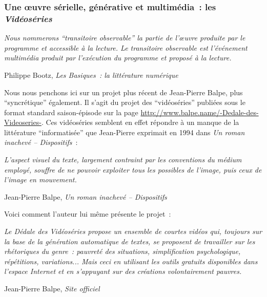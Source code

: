 \documentclass{article}
\newenvironment{citationbox}
{\begin{center}
		\begin{minipage}{.8\textwidth}
		}
		{
		\end{minipage}	
\end{center}
}
\begin{document}
			\subsubsection{Une œuvre sérielle, générative et multimédia~: les \textit{Vidéoséries}}
				\begin{citationbox}
					\textit{Nous nommerons ``transitoire observable'' la partie de l’œuvre produite par le programme et accessible à la lecture. Le transitoire observable est l’événement multimédia produit par l'exécution du programme et proposé à la lecture.}
					\begin{flushright}
						Philippe Bootz, \textit{Les Basiques~: la littérature numérique} \cite{bootz2006}
					\end{flushright}
				\end{citationbox}
				Nous nous penchons ici sur un projet plus récent de Jean-Pierre Balpe, plus ``syncrétique'' également. Il s'agit du projet des ``vidéoséries'' publiées sous le format standard saison-épisode sur la page \href{http://www.balpe.name/-Dedale-des-Videoseries-}{http://www.balpe.name/-Dedale-des-Videoseries-}. Ces vidéoséries semblent en effet répondre à un manque de la littérature ``informatisée'' que Jean-Pierre exprimait en 1994 dans \textit{Un roman inachevé -- Dispositifs} : 
				\begin{citationbox}
					\textit{L'aspect visuel du texte, largement contraint par les conventions du médium employé, souffre de ne pouvoir exploiter tous les possibles de l'image, puis ceux de l'image en mouvement.}
					\begin{flushright}
						Jean-Pierre Balpe, \textit{Un roman inachevé -- Dispositifs} \cite{balpe1994}
					\end{flushright}
				\end{citationbox}
				Voici comment l'auteur lui même présente le projet~:
				\begin{citationbox}
					\textit{Le Dédale des Vidéoséries propose un ensemble de courtes vidéos qui, toujours sur la base de la génération automatique de textes, se proposent de travailler sur les rhétoriques du genre : pauvreté des situations, simplification psychologique, répétitions, variations... Mais ceci en utilisant les outils gratuits disponibles dans l'espace Internet et en s'appuyant sur des créations volontairement pauvres.}
					\begin{flushright}
						Jean-Pierre Balpe, \textit{Site officiel} \cite{balpe_site}
					\end{flushright}
				\end{citationbox}
				
\end{document}
